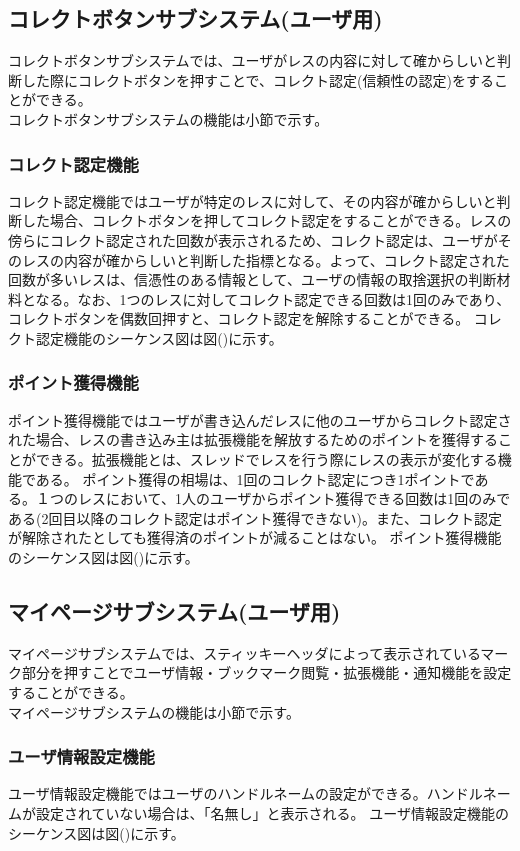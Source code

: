 \documentclass[a4j]{jarticle}
\begin{document}
\subsection{コレクトボタンサブシステム(ユーザ用)}
コレクトボタンサブシステムでは、ユーザがレスの内容に対して確からしいと判断した際にコレクトボタンを押すことで、コレクト認定(信頼性の認定)をすることができる。\\
コレクトボタンサブシステムの機能は小節で示す。

  \subsubsection{コレクト認定機能}
  コレクト認定機能ではユーザが特定のレスに対して、その内容が確からしいと判断した場合、コレクトボタンを押してコレクト認定をすることができる。レスの傍らにコレクト認定された回数が表示されるため、コレクト認定は、ユーザがそのレスの内容が確からしいと判断した指標となる。よって、コレクト認定された回数が多いレスは、信憑性のある情報として、ユーザの情報の取捨選択の判断材料となる。なお、1つのレスに対してコレクト認定できる回数は1回のみであり、コレクトボタンを偶数回押すと、コレクト認定を解除することができる。
コレクト認定機能のシーケンス図は図()に示す。
  \subsubsection{ポイント獲得機能}
  ポイント獲得機能ではユーザが書き込んだレスに他のユーザからコレクト認定された場合、レスの書き込み主は拡張機能を解放するためのポイントを獲得することができる。拡張機能とは、スレッドでレスを行う際にレスの表示が変化する機能である。
  ポイント獲得の相場は、1回のコレクト認定につき1ポイントである。１つのレスにおいて、1人のユーザからポイント獲得できる回数は1回のみである(2回目以降のコレクト認定はポイント獲得できない)。また、コレクト認定が解除されたとしても獲得済のポイントが減ることはない。
ポイント獲得機能のシーケンス図は図()に示す。

\subsection{マイページサブシステム(ユーザ用)}
マイページサブシステムでは、スティッキーヘッダによって表示されているマーク部分を押すことでユーザ情報・ブックマーク閲覧・拡張機能・通知機能を設定することができる。\\
マイページサブシステムの機能は小節で示す。
  \subsubsection{ユーザ情報設定機能}
  ユーザ情報設定機能ではユーザのハンドルネームの設定ができる。ハンドルネームが設定されていない場合は、「名無し」と表示される。
ユーザ情報設定機能のシーケンス図は図()に示す。
\end{document}
